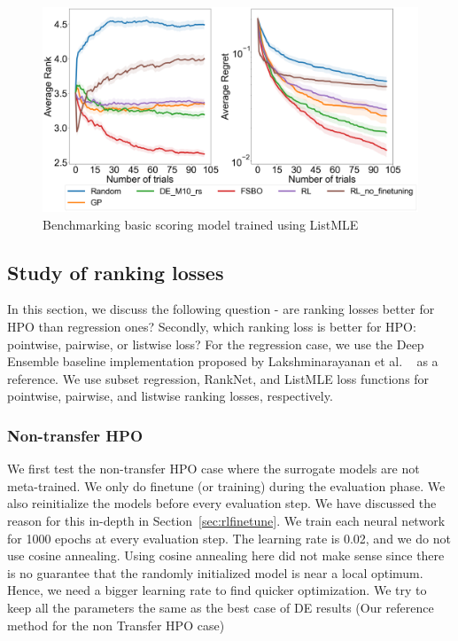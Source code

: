 \documentclass[12pt, twoside, ngerman]{report}
\begin{document}
\begin{figure}[h]
  \centering
    \includegraphics[scale=0.25]{images/RLEvaluationBasicScoring}
    \caption{Benchmarking basic scoring model trained using ListMLE}
    \label{fig:RLEvaluationBasicScoring}
\end{figure}
\fi

\subsection{Study of ranking losses}

In this section, we discuss the following question - are ranking losses better for HPO than regression ones? Secondly, which ranking loss is better for HPO: pointwise,  pairwise, or listwise loss?
For the regression case,  we use the Deep Ensemble baseline implementation proposed by Lakshminarayanan et al. ~\cite{DeepEnsemblePaper} as a reference. We use subset regression,  RankNet, and ListMLE loss functions for pointwise, pairwise, and listwise ranking losses, respectively. 

\subsubsection{Non-transfer HPO}
We first test the non-transfer HPO case where the surrogate models are not meta-trained. We only do finetune (or training) during the evaluation phase. We also reinitialize the models before every evaluation step. We have discussed the reason for this in-depth in Section~\ref{sec:rlfinetune}.
We train each neural network for 1000 epochs at every evaluation step. The learning rate is 0.02, and we do not use cosine annealing.
Using cosine annealing here did not make sense since there is no guarantee that the randomly initialized model is near a local optimum.
Hence, we need a bigger learning rate to find quicker optimization.
We try to keep all the parameters the same as the best case of DE results (Our reference method for the non Transfer HPO case)
\end{document}
